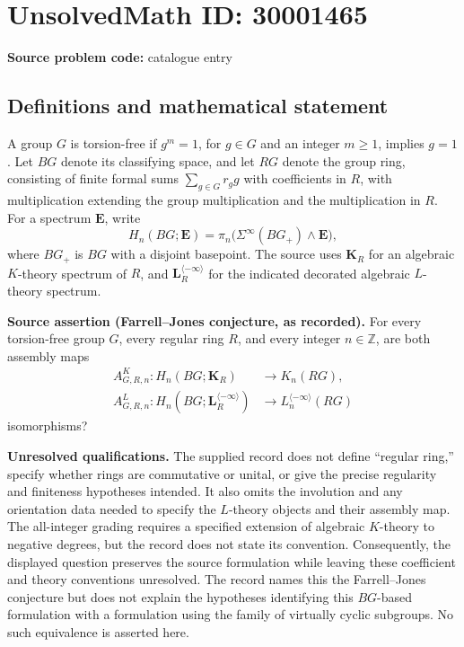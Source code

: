 \documentclass[11pt]{article}
\newcommand{\Z}{\mathbb{Z}}
\begin{document}
\section*{UnsolvedMath ID: 30001465}
\textbf{Source problem code:} catalogue entry
\subsection{Definitions and mathematical statement}
A group \(G\) is torsion-free if \(g^m=1\), for \(g\in G\) and an integer \(m\geq 1\), implies \(g=1\). Let \(BG\) denote its classifying space, and let \(RG\) denote the group ring, consisting of finite formal sums \(\sum_{g\in G}r_g g\) with coefficients in \(R\), with multiplication extending the group multiplication and the multiplication in \(R\). For a spectrum \(\mathbf E\), write
\[
H_n(BG;\mathbf E)=\pi_n\bigl(\Sigma^\infty(BG_+)\wedge\mathbf E\bigr),
\]
where \(BG_+\) is \(BG\) with a disjoint basepoint. The source uses \(\mathbf K_R\) for an algebraic \(K\)-theory spectrum of \(R\), and \(\mathbf L_R^{\langle-\infty\rangle}\) for the indicated decorated algebraic \(L\)-theory spectrum.

\textbf{Source assertion (Farrell--Jones conjecture, as recorded).} For every torsion-free group \(G\), every regular ring \(R\), and every integer \(n\in\Z\), are both assembly maps
\[
\begin{aligned}
A^K_{G,R,n}\colon H_n(BG;\mathbf K_R)&\longrightarrow K_n(RG),\\
A^L_{G,R,n}\colon H_n(BG;\mathbf L_R^{\langle-\infty\rangle})&\longrightarrow L_n^{\langle-\infty\rangle}(RG)
\end{aligned}
\]
isomorphisms?

\textbf{Unresolved qualifications.} The supplied record does not define ``regular ring,'' specify whether rings are commutative or unital, or give the precise regularity and finiteness hypotheses intended. It also omits the involution and any orientation data needed to specify the \(L\)-theory objects and their assembly map. The all-integer grading requires a specified extension of algebraic \(K\)-theory to negative degrees, but the record does not state its convention. Consequently, the displayed question preserves the source formulation while leaving these coefficient and theory conventions unresolved. The record names this the Farrell--Jones conjecture but does not explain the hypotheses identifying this \(BG\)-based formulation with a formulation using the family of virtually cyclic subgroups. No such equivalence is asserted here.
\end{document}
